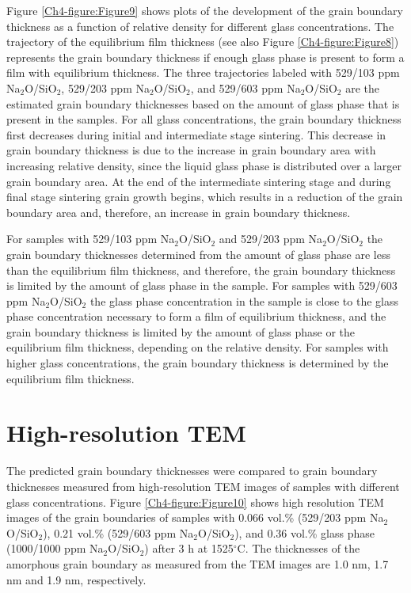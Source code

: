 Figure \ref{Ch4-figure:Figure9} shows plots of the development of the grain boundary thickness as a function of relative density for different glass concentrations. The trajectory of the equilibrium film thickness (see also Figure \ref{Ch4-figure:Figure8}) represents the grain boundary thickness if enough glass phase is present to form a film with equilibrium thickness. The three trajectories labeled with 529/103 ppm Na$_{2}$O/SiO$_{2}$, 529/203 ppm Na$_{2}$O/SiO$_{2}$, and 529/603 ppm Na$_{2}$O/SiO$_{2}$ are the estimated grain boundary thicknesses based on the amount of glass phase that is present in the samples. For all glass concentrations, the grain boundary thickness first decreases during initial and intermediate stage sintering. This decrease in grain boundary thickness is due to the increase in grain boundary area with increasing relative density, since the liquid glass phase is distributed over a larger grain boundary area. At the end of the intermediate sintering stage and during final stage sintering grain growth begins, which results in a reduction of the grain boundary area and, therefore, an increase in grain boundary thickness. 

For samples with 529/103 ppm Na$_{2}$O/SiO$_{2}$ and 529/203 ppm Na$_{2}$O/SiO$_{2}$ the grain boundary thicknesses determined from the amount of glass phase are less than the equilibrium film thickness, and therefore, the grain boundary thickness is limited by the amount of glass phase in the sample. For samples with 529/603 ppm Na$_{2}$O/SiO$_{2}$ the glass phase concentration in the sample is close to the glass phase concentration necessary to form a film of equilibrium thickness, and the grain boundary thickness is limited by the amount of glass phase or the equilibrium film thickness, depending on the relative density. For samples with higher glass concentrations, the grain boundary thickness is determined by the equilibrium film thickness. 

\section{High-resolution TEM}
The predicted grain boundary thicknesses were compared to grain boundary thicknesses measured from high-resolution TEM images of samples with different glass concentrations. Figure \ref{Ch4-figure:Figure10} shows high resolution TEM images of the grain boundaries of samples with 0.066 vol.\% (529/203 ppm Na$_{2}$O/SiO$_{2}$), 0.21 vol.\% (529/603 ppm Na$_{2}$O/SiO$_{2}$), and 0.36 vol.\% glass phase (1000/1000 ppm Na$_{2}$O/SiO$_{2}$) after 3 h at 1525$^{\circ}$C. The thicknesses of the amorphous grain boundary as measured from the TEM images are 1.0 nm, 1.7 nm and 1.9 nm, respectively. 

